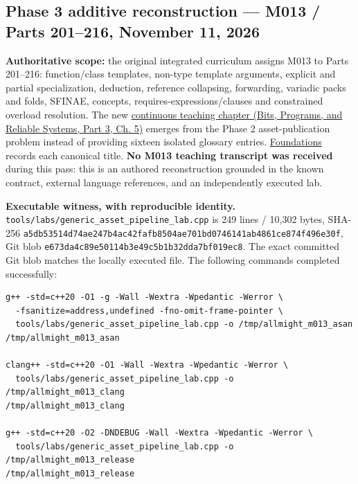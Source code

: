 \subsection{Phase 3 additive reconstruction --- M013 / Parts 201--216, November 11, 2026}\label{appendix-a103e7846d21-phase-3-additive-reconstruction-m013-parts-201216-november-11-2026}

\hypertarget{appendix-a103e7846d21-phase-3-additive-reconstruction-m013-parts-201216-november-11-2026}{}

\textbf{Authoritative scope:} the original integrated curriculum assigns M013 to Parts 201--216: function/class templates, non-type template arguments, explicit and partial specialization, deduction, reference collapsing, forwarding, variadic packs and folds, SFINAE, concepts, requires-expressions/clauses and constrained overload resolution. The new \href{../01-Bits-Programs-and-Reliable-Systems-P03/main.pdf\#nameddest=01-foundations-i-ch005-one-asset-pipeline-many-asset-types-generic-code-without-accidental-promises}{continuous teaching chapter (Bits, Programs, and Reliable Systems, Part 3, Ch. 5)} emerges from the Phase 2 asset-publication problem instead of providing sixteen isolated glossary entries. \hyperref[appendix-fd090d982a15-m013-parts-201216-generic-asset-preparation-with-constrained-apis]{Foundations} records each canonical title. \textbf{No M013 teaching transcript was received} during this pass: this is an authored reconstruction grounded in the known contract, external language references, and an independently executed lab.

\textbf{Executable witness, with reproducible identity.} \texttt{tools/labs/generic\_asset\_pipeline\_lab.cpp} is 249 lines / 10,302 bytes, SHA-256 \texttt{a5db53514d74ae247b4ac42fafb8504ae701bd0746141ab4861ce874f496e30f}, Git blob \texttt{e673da4c89e50114b3e49c5b1b32dda7bf019ec8}. The exact committed Git blob matches the locally executed file. The following commands completed successfully:

\begin{verbatim}
g++ -std=c++20 -O1 -g -Wall -Wextra -Wpedantic -Werror \
  -fsanitize=address,undefined -fno-omit-frame-pointer \
  tools/labs/generic_asset_pipeline_lab.cpp -o /tmp/allmight_m013_asan
/tmp/allmight_m013_asan

clang++ -std=c++20 -O1 -Wall -Wextra -Wpedantic -Werror \
  tools/labs/generic_asset_pipeline_lab.cpp -o /tmp/allmight_m013_clang
/tmp/allmight_m013_clang

g++ -std=c++20 -O2 -DNDEBUG -Wall -Wextra -Wpedantic -Werror \
  tools/labs/generic_asset_pipeline_lab.cpp -o /tmp/allmight_m013_release
/tmp/allmight_m013_release
\end{verbatim}

